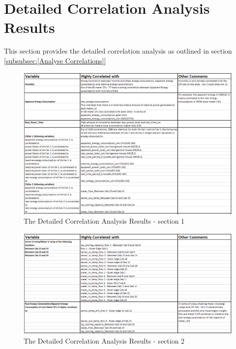\documentclass[12pt]{scrartcl}
\begin{document}
\section{Detailed Correlation Analysis Results}
\label{sec:[Correlation Analysis Results]}
This section provides the detailed correlation analysis as outlined in section \ref{subsubsec:[Analyse Correlations]}





\begin{figure}[h]
  \caption{The Detailed Correlation Analysis Results - section 1}
  \label{fig:Correlation_Analysis_1}
  \centering
    \includegraphics[scale=0.50]{Correlation_Analysis_1}
\end{figure} 

\begin{figure}[h]
  \caption{The Detailed Correlation Analysis Results - section 2}
  \label{fig:Correlation_Analysis_2}
  \centering
    \includegraphics[scale=0.50]{Correlation_Analysis_2}
\end{figure} 
\end{document}
